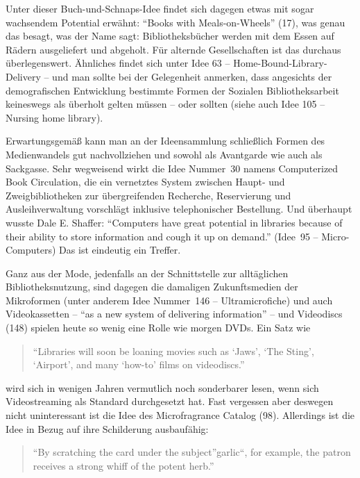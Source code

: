 \documentclass[a4paper,
fontsize=11pt,
oneside,
numbers=noperiodatend,
parskip=half-,
bibliography=totoc,
final
]{scrartcl}
\begin{document}
Unter dieser Buch-und-Schnaps-Idee findet sich dagegen etwas mit sogar
wachsendem Potential erwähnt: \enquote{Books with Meals-on-Wheels} (17),
was genau das besagt, was der Name sagt: Bibliotheksbücher werden mit
dem Essen auf Rädern ausgeliefert und abgeholt. Für alternde
Gesellschaften ist das durchaus überlegenswert. Ähnliches findet sich
unter Idee 63 -- Home-Bound-Library-Delivery -- und man sollte bei der
Gelegenheit anmerken, dass angesichts der demografischen Entwicklung
bestimmte Formen der Sozialen Bibliotheksarbeit keineswegs als überholt
gelten müssen -- oder sollten (siehe auch Idee 105 -- Nursing home
library).

Erwartungsgemäß kann man an der Ideensammlung schließlich Formen des
Medienwandels gut nachvollziehen und sowohl als Avantgarde wie auch als
Sackgasse. Sehr wegweisend wirkt die Idee Nummer~30 namens Computerized
Book Circulation, die ein vernetztes System zwischen Haupt- und
Zweigbibliotheken zur übergreifenden Recherche, Reservierung und
Ausleihverwaltung vorschlägt inklusive telephonischer Bestellung. Und
überhaupt wusste Dale E. Shaffer: \enquote{Computers have great
potential in libraries because of their ability to store information and
cough it up on demand.} (Idee~95 -- Micro-Computers) Das ist eindeutig
ein Treffer.

Ganz aus der Mode, jedenfalls an der Schnittstelle zur alltäglichen
Bibliotheksnutzung, sind dagegen die damaligen Zukunftsmedien der
Mikroformen (unter anderem Idee Nummer~146 -- Ultramicrofiche) und auch
Videokassetten -- \enquote{as a new system of delivering information} --
und Videodiscs (148) spielen heute so wenig eine Rolle wie morgen DVDs.
Ein Satz wie

\begin{quote}
\enquote{Libraries will soon be loaning movies such as \enquote{Jaws},
\enquote{The Sting}, \enquote{Airport}, and many \enquote{how-to} films
on videodiscs.}
\end{quote}

wird sich in wenigen Jahren vermutlich noch sonderbarer lesen, wenn sich
Videostreaming als Standard durchgesetzt hat. Fast vergessen aber
deswegen nicht uninteressant ist die Idee des Microfragrance Catalog
(98). Allerdings ist die Idee in Bezug auf ihre Schilderung ausbaufähig:

\begin{quote}
\enquote{By scratching the card under the subject}garlic\enquote{, for
example, the patron receives a strong whiff of the potent herb.}
\end{quote}
\end{document}

